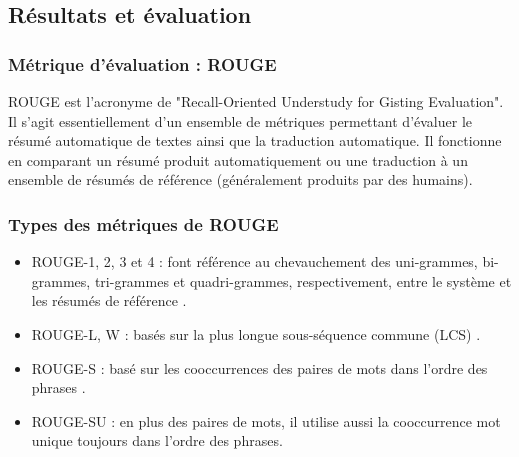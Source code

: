     \subsection{Résultats et évaluation}
        \subsubsection{Métrique d'évaluation : ROUGE\label{metrique-eval}}
        ROUGE est l'acronyme de "Recall-Oriented Understudy for Gisting Evaluation". Il s'agit essentiellement d'un ensemble de métriques permettant d'évaluer le résumé automatique de textes ainsi que la traduction automatique. Il fonctionne en comparant un résumé produit automatiquement ou une traduction à un ensemble de résumés de référence (généralement produits par des humains). \cite{rouge0}
    
        \subsubsection{Types des métriques de ROUGE\label{type-rouge}}
        \begin{itemize}
            \item{ROUGE-1, 2, 3 et 4 : font référence au chevauchement des uni-grammes, bi-grammes, tri-grammes et quadri-grammes, respectivement, entre le système et les résumés de référence \cite{rouge1}.}\\
            \item{ROUGE-L, W : basés sur la plus longue sous-séquence commune (LCS) \cite{rouge2}.}\\
            \item{ROUGE-S : basé sur les cooccurrences des paires de mots dans l'ordre des phrases \cite{rouge2}.}\\
            \item{ROUGE-SU : en plus des paires de mots, il utilise aussi la cooccurrence mot unique toujours dans l'ordre des phrases.}
        \end{itemize}
    

